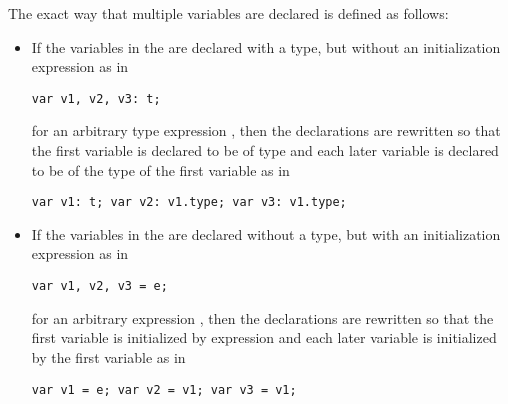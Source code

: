 The exact way that multiple variables are declared is defined as
follows:
\begin{itemize}
\item If the variables in the  are declared
with a type, but without an initialization expression as in
\begin{chapel}
\begin{verbatim}
var v1, v2, v3: t;
\end{verbatim}
\end{chapel}
for an arbitrary type expression , then the declarations are
rewritten so that the first variable is declared to be of
type  and each later variable is declared to be of the type of
the first variable as in
\begin{chapel}
\begin{verbatim}
var v1: t; var v2: v1.type; var v3: v1.type;
\end{verbatim}
\end{chapel}

\item If the variables in the  are declared
without a type, but with an initialization expression as in
\begin{chapel}
\begin{verbatim}
var v1, v2, v3 = e;
\end{verbatim}
\end{chapel}
for an arbitrary expression , then the declarations are
rewritten so that the first variable is initialized by
expression  and each later variable is initialized by the
first variable as in
\begin{chapel}
\begin{verbatim}
var v1 = e; var v2 = v1; var v3 = v1;
\end{verbatim}
\end{chapel}


\end{itemize}
